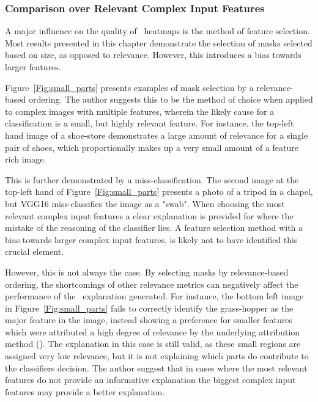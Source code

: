 \subsubsection{Comparison over Relevant Complex Input Features}

A major influence on the quality of \CTC\ heatmaps is the method of feature selection. Most results presented in this chapter demonstrate the selection of masks selected based on size, as opposed to relevance. However, this introduces a bias towards larger features.

Figure~\ref{Fig:small_parts} presents examples of mask selection by a relevance-based ordering. The author suggests this to be the method of choice when applied to complex images with multiple features, wherein the likely cause for a classification is a small, but highly relevant feature. For instance, the top-left hand image of a shoe-store demonstrates a large amount of relevance for a single pair of shoes, which proportionally makes up a very small amount of a feature rich image.

This is further demonstrated by a miss-classification. The second image at the top-left hand of Figure~\ref{Fig:small_parts} presents a photo of a tripod in a chapel, but VGG16 miss-classifies the image as a "swab". When choosing the most relevant complex input features a clear explanation is provided for where the mistake of the reasoning of the classifier lies. A feature selection method with a bias towards larger complex input features, is likely not to have identified this crucial element.

However, this is not always the case. By selecting masks by relevance-based ordering, the shortcomings of other relevance metrics can negatively affect the performance of the \CTC\ explanation generated. For instance, the bottom left image in Figure~\ref{Fig:small_parts} fails to correctly identify the grass-hopper as the major feature in the image, instead showing a preference for smaller features which were attributed a high degree of relevance by the underlying attribution method (\LRP). The explanation in this case is still valid, as these small regions are assigned very low relevance, but it is not explaining which parts do contribute to the classifiers decision. The author suggest that in cases where the most relevant features do not provide an informative explanation the biggest complex input features may provide a better explanation.


